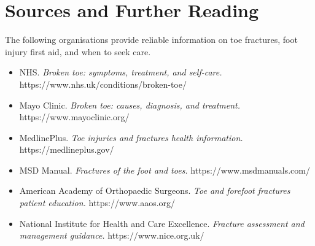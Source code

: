 \section*{Sources and Further Reading}
The following organisations provide reliable information on toe fractures, foot injury first aid, and when to seek care.

\begin{itemize}
    \item NHS. \textit{Broken toe: symptoms, treatment, and self-care.} https://www.nhs.uk/conditions/broken-toe/
    \item Mayo Clinic. \textit{Broken toe: causes, diagnosis, and treatment.} https://www.mayoclinic.org/
    \item MedlinePlus. \textit{Toe injuries and fractures health information.} https://medlineplus.gov/
    \item MSD Manual. \textit{Fractures of the foot and toes.} https://www.msdmanuals.com/
    \item American Academy of Orthopaedic Surgeons. \textit{Toe and forefoot fractures patient education.} https://www.aaos.org/
    \item National Institute for Health and Care Excellence. \textit{Fracture assessment and management guidance.} https://www.nice.org.uk/
\end{itemize}
